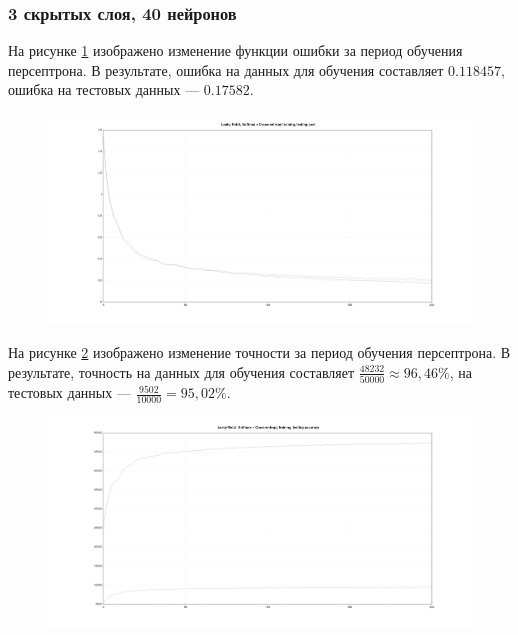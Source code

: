 \documentclass[a4paper, 14pt]{extarticle}
\begin{document}
\subsubsection{3 скрытых слоя, 40 нейронов}


На рисунке \ref{fig:3_40_leaky_relu_softmax_cross_entropy_cost} изображено изменение функции ошибки за период обучения персептрона.
В результате, ошибка на данных для обучения составляет $0.118457$, ошибка на тестовых данных --- $0.17582$.

\begin{figure}[!htb]
  \centering\includegraphics[width=\textwidth]{images/3_40_leaky_relu_softmax_cross_entropy_cost.png}
  \caption{}
  \label{fig:3_40_leaky_relu_softmax_cross_entropy_cost}
\end{figure}

На рисунке \ref{fig:3_40_leaky_relu_softmax_cross_entropy_accuracy} изображено изменение точности за период обучения персептрона.
В результате, точность на данных для обучения составляет $\frac{48232}{50000} \approx 96,46\%$, на тестовых данных --- $\frac{9502}{10000} = 95,02\%$.

\begin{figure}[!htb]
  \centering\includegraphics[width=\textwidth]{images/3_40_leaky_relu_softmax_cross_entropy_accuracy.png}
  \caption{}
  \label{fig:3_40_leaky_relu_softmax_cross_entropy_accuracy}
\end{figure}
\end{document}
